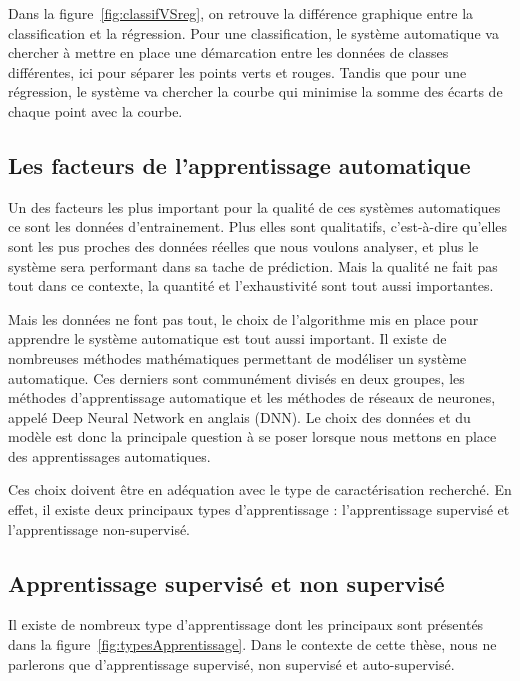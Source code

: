 

Dans la figure~\ref{fig:classifVSreg}, on retrouve la différence graphique entre la classification et la régression. Pour une classification, le système automatique va chercher à mettre en place une démarcation entre les données de classes différentes, ici pour séparer les points verts et rouges. Tandis que pour une régression, le système va chercher la courbe qui minimise la somme des écarts de chaque point avec la courbe.

\subsection{Les facteurs de l'apprentissage automatique}
Un des facteurs les plus important pour la qualité de ces systèmes automatiques ce sont les données d'entrainement. Plus elles sont qualitatifs, c'est-à-dire qu'elles sont les pus proches des données réelles que nous voulons analyser, et plus le système sera performant dans sa tache de prédiction. Mais la qualité ne fait pas tout dans ce contexte, la quantité et l'exhaustivité sont tout aussi importantes.

Mais les données ne font pas tout, le choix de l'algorithme mis en place pour apprendre le système automatique est tout aussi important. Il existe de nombreuses méthodes mathématiques permettant de modéliser un système automatique. Ces derniers sont communément divisés en deux groupes, les méthodes d'apprentissage automatique et les méthodes de réseaux de neurones, appelé Deep Neural Network en anglais (DNN).
Le choix des données et du modèle est donc la principale question à se poser lorsque nous mettons en place des apprentissages automatiques.

Ces choix doivent être en adéquation avec le type de caractérisation recherché. En effet, il existe deux principaux types d'apprentissage : l'apprentissage supervisé et l'apprentissage non-supervisé.

\subsection{Apprentissage supervisé et non supervisé}


Il existe de nombreux type d'apprentissage dont les principaux sont présentés dans la figure~\ref{fig:typesApprentissage}. Dans le contexte de cette thèse, nous ne parlerons que d'apprentissage supervisé, non supervisé et auto-supervisé.

